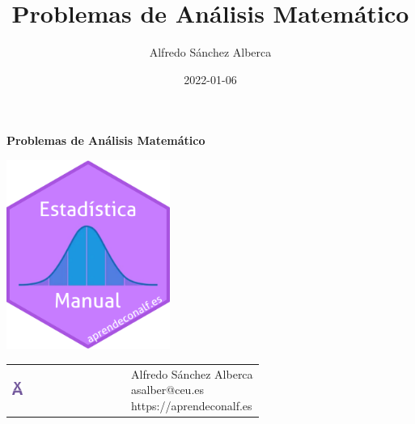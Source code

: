 \documentclass[
  a4paper,
]{scrreport}
\title{Problemas de Análisis Matemático}
\author{Alfredo Sánchez Alberca}
\date{2022-01-06}
\renewcommand*\contentsname{Tabla de contenidos}
\newcommand\contentsname{Tabla de contenidos}
\theoremstyle{definition}
\theoremstyle{remark}
\begin{document}
\begin{titlepage}

\begin{center}
\vspace*{5cm}

\Huge
{\textbf{\textsf{Problemas de Análisis Matemático}}}

\vspace{0.5cm}
\LARGE
{\textbf{\textsf{}}}

\vspace{1.5cm}

\includegraphics[width=0.4\textwidth]{img/logos/sticker.png}
\end{center}

\vfill

\begin{flushleft}
\begin{tabular}{ll}
\includegraphics[width=0.1\textwidth]{img/logos/aprendeconalf.png} & \parbox[b]{5cm}{\Large\textsf{Alfredo
Sánchez
Alberca}\\ \textsf{asalber@ceu.es} \\ \textsf{https://aprendeconalf.es}}
\end{tabular}
\end{flushleft}
\end{titlepage}\ifdefined\Shaded\renewenvironment{Shaded}{\begin{tcolorbox}[interior hidden, frame hidden, borderline west={3pt}{0pt}{shadecolor}, sharp corners, boxrule=0pt, breakable, enhanced]}{\end{tcolorbox}}\fi

\renewcommand*\contentsname{Tabla de contenidos}
{
\hypersetup{linkcolor=}
\setcounter{tocdepth}{2}
\tableofcontents
}
\end{document}
